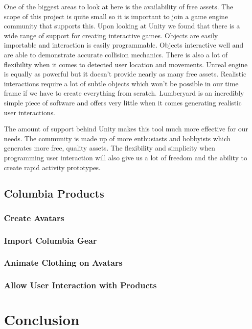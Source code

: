 \documentclass[10pt,journal,compsoc,onecolumn, draftclsnofoot]{IEEEtran}
\begin{document}
One of the biggest areas to look at here is the availability of free assets.
The scope of this project is quite small so it is important to join a game engine community that supports this.
Upon looking at Unity we found that there is a wide range of support for creating interactive games\cite{unity_getting_started}.
Objects are easily importable and interaction is easily programmable.
Objects interactive well and are able to demonstrate accurate collision mechanics.
There is also a lot of flexibility when it comes to detected user location and movements.
Unreal engine is equally as powerful\cite{unreal_animation} but it doesn’t provide nearly as many free assets.
Realistic interactions require a lot of subtle objects which won’t be possible in our time frame if we have to create everything from scratch.
Lumberyard is an incredibly simple piece of software and offers very little when it comes generating realistic user interactions\cite{lumberyard_object_system}.

The amount of support behind Unity makes this tool much more effective for our needs.
The community is made up of more enthusiasts and hobbyists which generates more free, quality assets.
The flexibility and simplicity when programming user interaction will also give us a lot of freedom and the ability to create rapid activity prototypes.
\vspace{2mm}


\subsection{Columbia Products}
\subsubsection{Create Avatars}

\subsubsection{Import Columbia Gear}

\subsubsection{Animate Clothing on Avatars}

\subsubsection{Allow User Interaction with Products}



\section{Conclusion}




\end{document}
